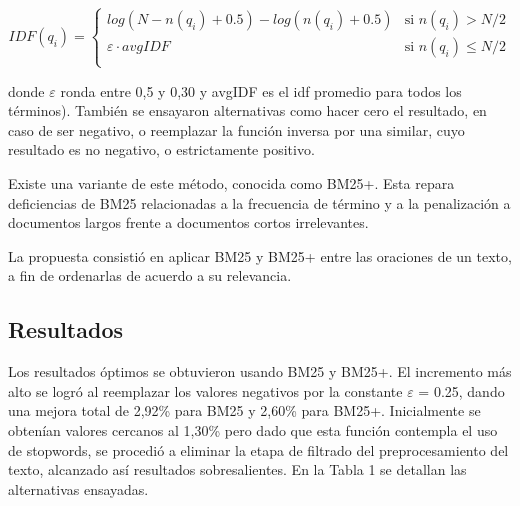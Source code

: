 \documentclass[a4paper]{article}
\begin{document}
\begin{equation}
 IDF(q_i) =
  \begin{cases}
       log(N - n(q_i) + 0.5) - log(n(q_i) + 0.5)    & \text{si }  n(q_i) > N/2\\
       \varepsilon \cdot avgIDF                     & \text{si }  n(q_i) \leq N/2\\
  \end{cases}
\end{equation}                
                
donde $\varepsilon$ ronda entre 0,5 y 0,30 y avgIDF es el idf promedio para todos los términos).
También se ensayaron alternativas como hacer cero el resultado, en caso de ser negativo, o reemplazar la función inversa por una similar, cuyo resultado es no negativo, o estrictamente positivo. 

Existe una variante de este método, conocida como BM25+. Esta repara deficiencias de BM25 relacionadas a la frecuencia de término y a la penalización a documentos largos frente a documentos cortos irrelevantes.

La propuesta consistió en aplicar BM25 y BM25+ entre las oraciones de un texto, a fin de ordenarlas de acuerdo a su relevancia.


\subsection{Resultados}
Los resultados óptimos se obtuvieron usando BM25 y BM25+. El incremento más alto se logró al reemplazar los valores negativos por la constante $\varepsilon$ = 0.25, dando una mejora total de 2,92\% para BM25 y 2,60\% para BM25+. Inicialmente se obtenían valores cercanos al 1,30\% pero dado que esta función contempla el uso de stopwords, se procedió a eliminar la etapa de filtrado del preprocesamiento del texto, alcanzado así resultados sobresalientes. En la Tabla 1 se detallan las alternativas ensayadas.
\end{document}
